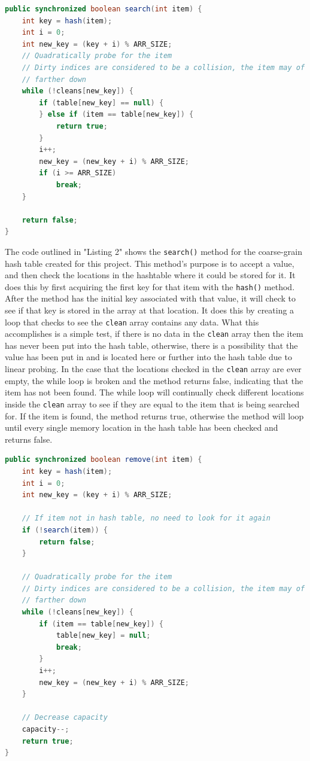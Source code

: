 \documentclass[conference]{IEEEtran}
\begin{document}
\begin{lstlisting}[language={Java},caption=Source code for the course-grain search() method.,captionpos=b,breaklines=true,frame=single]
public synchronized boolean search(int item) {
    int key = hash(item);
    int i = 0;
    int new_key = (key + i) % ARR_SIZE;
    // Quadratically probe for the item
    // Dirty indices are considered to be a collision, the item may of been probed
    // farther down
    while (!cleans[new_key]) {
        if (table[new_key] == null) {
        } else if (item == table[new_key]) {
            return true;
        }
        i++;
        new_key = (new_key + i) % ARR_SIZE;
        if (i >= ARR_SIZE)
            break;
    }

    return false;
}
\end{lstlisting}

The code outlined in "Listing 2" shows the \verb|search()| method for the coarse-grain hash table created for this project. This method's purpose is to accept 
a value, and then check the locations in the hashtable where it could be stored for it. It does this by first acquiring the first key for that item with the
\verb|hash()| method. After the method has the initial key associated with that value, it will check to see if that key is stored in the array at that location.
It does this by creating a loop that checks to see the \verb|clean| array contains any data. What this accomplishes is a simple test, if there is no data in the \verb|clean| array
then the item has never been put into the hash table, otherwise, there is a possibility that the value has been put in and is located here or further into
the hash table due to linear probing. In the case that the locations checked in the \verb|clean| array are ever empty, the while loop is broken and the method returns
false, indicating that the item has not been found. The while loop will continually check different locations inside the \verb|clean| array to see if they are equal to
the item that is being searched for. If the item is found, the method returns true, otherwise the method will loop until every single memory location in the hash table has
been checked and returns false.

\begin{lstlisting}[language={Java},caption=Source code for the course-grain remove() method.,captionpos=b,breaklines=true,frame=single]
public synchronized boolean remove(int item) {
    int key = hash(item);
    int i = 0;
    int new_key = (key + i) % ARR_SIZE;

    // If item not in hash table, no need to look for it again
    if (!search(item)) {
        return false;
    }

    // Quadratically probe for the item
    // Dirty indices are considered to be a collision, the item may of been probed
    // farther down
    while (!cleans[new_key]) {
        if (item == table[new_key]) {
            table[new_key] = null;
            break;
        }
        i++;
        new_key = (new_key + i) % ARR_SIZE;
    }

    // Decrease capacity
    capacity--;
    return true;
}
\end{lstlisting}
\end{document}
